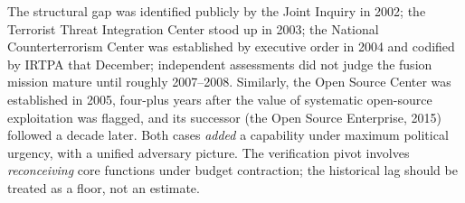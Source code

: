 \documentclass[11pt,letterpaper]{article}
\begin{document}
\begin{infobox}
The structural gap was identified publicly by the Joint Inquiry in 2002; the Terrorist Threat Integration Center stood up in 2003; the National Counterterrorism Center was established by executive order in 2004 and codified by IRTPA that December; independent assessments did not judge the fusion mission mature until roughly 2007--2008. Similarly, the Open Source Center was established in 2005, four-plus years after the value of systematic open-source exploitation was flagged, and its successor (the Open Source Enterprise, 2015) followed a decade later. Both cases \textit{added} a capability under maximum political urgency, with a unified adversary picture. The verification pivot involves \textit{reconceiving} core functions under budget contraction; the historical lag should be treated as a floor, not an estimate.
\end{infobox}
\end{document}
